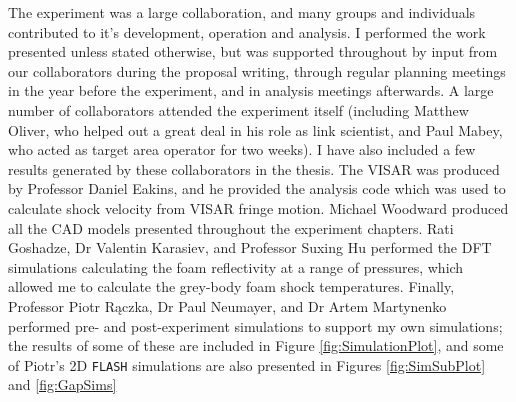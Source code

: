The experiment was a large collaboration, and many groups and individuals contributed to it's development, operation and analysis. I performed the work presented unless stated otherwise, but was supported throughout by input from our collaborators during the proposal writing, through regular planning meetings in the year before the experiment, and in analysis meetings afterwards. A large number of collaborators attended the experiment itself (including Matthew Oliver, who helped out a great deal in his role as link scientist, and Paul Mabey, who acted as target area operator for two weeks). I have also included a few results generated by these collaborators in the thesis. The VISAR was produced by Professor Daniel Eakins, and he provided the analysis code which was used to calculate shock velocity from VISAR fringe motion. Michael Woodward produced all the CAD models presented throughout the experiment chapters. Rati Goshadze, Dr Valentin  Karasiev, and Professor Suxing Hu performed the DFT simulations calculating the foam reflectivity at a range of pressures, which allowed me to calculate the grey-body foam shock temperatures. Finally, Professor Piotr R\k{a}czka, Dr Paul Neumayer, and Dr Artem Martynenko performed pre- and post-experiment simulations to support my own simulations; the results of some of these are included in Figure \ref{fig:SimulationPlot}, and some of Piotr's 2D \texttt{FLASH} simulations are also presented in Figures \ref{fig:SimSubPlot} and \ref{fig:GapSims}


